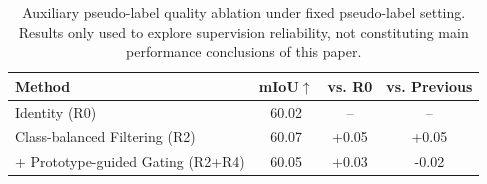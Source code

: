 \begin{table}[t]
  \centering
  \small
  \setlength{\tabcolsep}{4pt}
  \renewcommand{\arraystretch}{1.08}
  \caption{Auxiliary pseudo-label quality ablation under fixed pseudo-label setting. Results only used to explore supervision reliability, not constituting main performance conclusions of this paper.}
  \label{tab:pseudo_label_ablation}
  \begin{tabular}{lccc}
    \toprule
    Method & mIoU$\uparrow$ & vs. R0 & vs. Previous \\
    \midrule
    Identity (R0) & 60.02 & -- & -- \\
    Class-balanced Filtering (R2) & 60.07 & +0.05 & +0.05 \\
    + Prototype-guided Gating (R2+R4) & 60.05 & +0.03 & -0.02 \\
    \bottomrule
  \end{tabular}
\end{table}
